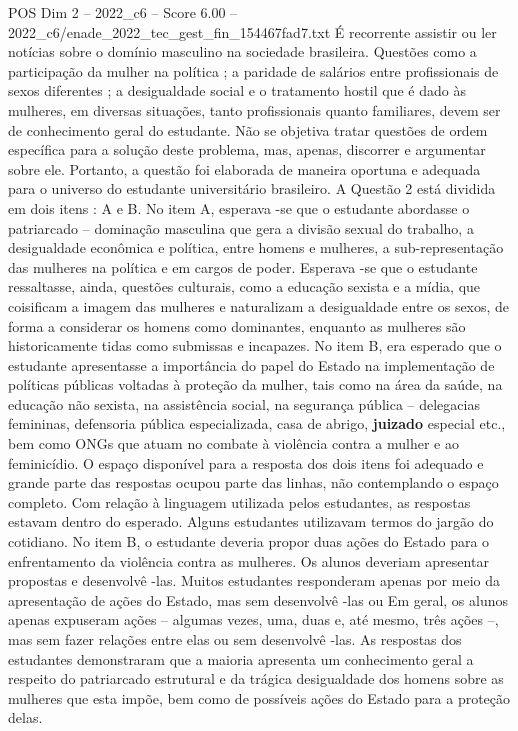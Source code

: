\begin{textsample}{POS Dim 2 – 2022\_c6 – Score 6.00 – 2022\_c6/enade\_2022\_tec\_gest\_fin\_154467fad7.txt}
É recorrente assistir ou ler notícias sobre o domínio masculino na sociedade brasileira.
Questões como a participação da mulher na política ; a paridade de salários entre profissionais de sexos diferentes ; a desigualdade social e o tratamento hostil que é dado às mulheres, em diversas situações, tanto profissionais quanto familiares, devem ser de conhecimento geral do estudante.
Não se objetiva tratar questões de ordem específica para a solução deste problema, mas, apenas, discorrer e argumentar sobre ele.
Portanto, a questão foi elaborada de maneira oportuna e adequada para o universo do estudante universitário brasileiro.
A Questão 2 está dividida em dois itens : A e B.
No item A, esperava -se que o estudante abordasse o patriarcado – dominação masculina que gera a divisão sexual do trabalho, a desigualdade econômica e política, entre homens e mulheres, a sub-representação das mulheres na política e em cargos de poder.
Esperava -se que o estudante ressaltasse, ainda, questões culturais, como a educação sexista e a mídia, que coisificam a imagem das mulheres e naturalizam a desigualdade entre os sexos, de forma a considerar os homens como dominantes, enquanto as mulheres são historicamente tidas como submissas e incapazes.
No item B, era esperado que o estudante apresentasse a importância do papel do Estado na implementação de políticas públicas voltadas à proteção da mulher, tais como na área da saúde, na educação não sexista, na assistência social, na segurança pública – delegacias femininas, defensoria pública especializada, casa de abrigo, \textbf{juizado} especial etc., bem como ONGs que atuam no combate à violência contra a mulher e ao feminicídio.
O espaço disponível para a resposta dos dois itens foi adequado e grande parte das respostas ocupou parte das linhas, não contemplando o espaço completo.
Com relação à linguagem utilizada pelos estudantes, as respostas estavam dentro do esperado.
Alguns estudantes utilizavam termos do jargão do cotidiano.
No item B, o estudante deveria propor duas ações do Estado para o enfrentamento da violência contra as mulheres.
Os alunos deveriam apresentar propostas e desenvolvê -las.
Muitos estudantes responderam apenas por meio da apresentação de ações do Estado, mas sem desenvolvê -las ou Em geral, os alunos apenas expuseram ações – algumas vezes, uma, duas e, até mesmo, três ações –, mas sem fazer relações entre elas ou sem desenvolvê -las.
As respostas dos estudantes demonstraram que a maioria apresenta um conhecimento geral a respeito do patriarcado estrutural e da trágica desigualdade dos homens sobre as mulheres que esta impõe, bem como de possíveis ações do Estado para a proteção delas.

\end{textsample}
